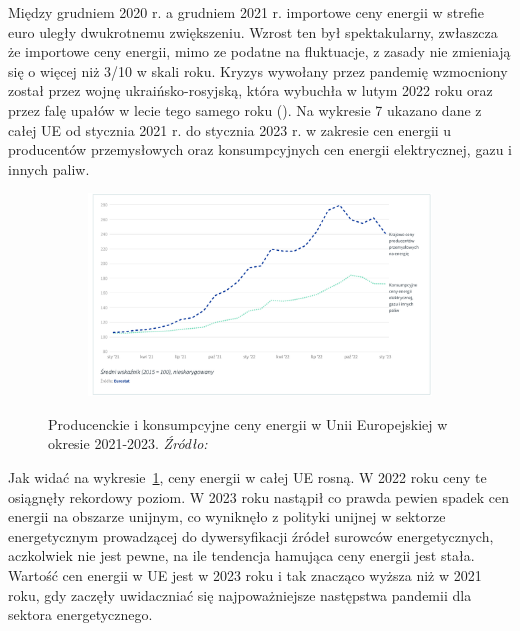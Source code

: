 \documentclass[polish, twoside, 12pt, a4paper]{article}
\theoremstyle{definition}
\theoremstyle{plain}
\theoremstyle{remark}
\begin{document}
Między grudniem 2020 r. a grudniem 2021 r. importowe ceny energii w strefie euro uległy dwukrotnemu zwiększeniu. Wzrost ten był spektakularny, zwłaszcza że importowe ceny energii, mimo ze podatne na fluktuacje, z zasady nie zmieniają się o więcej niż 3/10 w skali roku. Kryzys wywołany przez pandemię wzmocniony został przez wojnę ukraińsko-rosyjską, która wybuchła w lutym 2022 roku oraz przez falę upałów w lecie tego samego roku (\cite{council2023}). Na wykresie 7 ukazano dane z całej UE od stycznia 2021 r. do stycznia 2023 r. w zakresie cen energii u producentów przemysłowych oraz konsumpcyjnych cen energii elektrycznej, gazu i innych paliw.


\begin{figure}[hbt]
  \centering

  \begin{subfigure}[t]{0.45\textwidth}
    \includegraphics[width=\textwidth]{./figure_9}
  \end{subfigure}

  \captionsetup{margin=10pt,font=small,labelfont=bf,width=.8\textwidth}

  \caption[Producenckie i konsumpcyjne ceny energii w Unii Europejskiej w okresie 2021-2023]{Producenckie i konsumpcyjne ceny energii w Unii Europejskiej w okresie 2021-2023. \textit{Źródło:} \cite{council2023}}\label{fig:x9}
\end{figure}

Jak widać na wykresie~\ref{fig:x9}, ceny energii w całej UE rosną. W 2022 roku ceny te osiągnęły rekordowy poziom. W 2023 roku nastąpił co prawda pewien spadek cen energii na obszarze unijnym, co wyniknęło z polityki unijnej w sektorze energetycznym prowadzącej do dywersyfikacji źródeł surowców energetycznych, aczkolwiek nie jest pewne, na ile tendencja hamująca ceny energii jest stała. Wartość cen energii w UE jest w 2023 roku i tak znacząco wyższa niż w 2021 roku, gdy zaczęły uwidaczniać się najpoważniejsze następstwa pandemii dla sektora energetycznego. 
\end{document}
